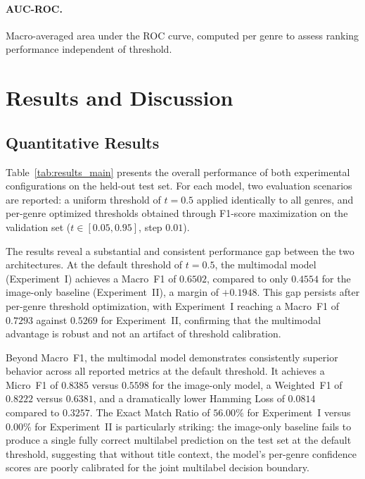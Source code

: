 \documentclass[conference]{IEEEtran}
\begin{document}
\paragraph{AUC-ROC.} Macro-averaged area under the ROC curve, computed 
per genre to assess ranking performance independent of threshold.

\section{Results and Discussion}
\label{sec:results}

\subsection{Quantitative Results}

Table~\ref{tab:results_main} presents the overall performance of both
experimental configurations on the held-out test set. For each model,
two evaluation scenarios are reported: a uniform threshold of
$t = 0.5$ applied identically to all genres, and per-genre optimized
thresholds obtained through F1-score maximization on the validation set
($t \in [0.05, 0.95]$, step $0.01$).

The results reveal a substantial and consistent performance gap between
the two architectures. At the default threshold of $t = 0.5$, the
multimodal model (Experiment~I) achieves a Macro~F1 of $0.6502$,
compared to only $0.4554$ for the image-only baseline
(Experiment~II), a margin of $+0.1948$. This gap persists after
per-genre threshold optimization, with Experiment~I reaching a
Macro~F1 of $0.7293$ against $0.5269$ for Experiment~II, confirming
that the multimodal advantage is robust and not an artifact of
threshold calibration.

Beyond Macro~F1, the multimodal model demonstrates consistently
superior behavior across all reported metrics at the default threshold.
It achieves a Micro~F1 of $0.8385$ versus $0.5598$ for the
image-only model, a Weighted~F1 of $0.8222$ versus $0.6381$, and a
dramatically lower Hamming Loss of $0.0814$ compared to $0.3257$.
The Exact Match Ratio of $56.00\%$ for Experiment~I versus $0.00\%$
for Experiment~II is particularly striking: the image-only baseline
fails to produce a single fully correct multilabel prediction on the
test set at the default threshold, suggesting that without title
context, the model's per-genre confidence scores are poorly calibrated
for the joint multilabel decision boundary.
\end{document}
